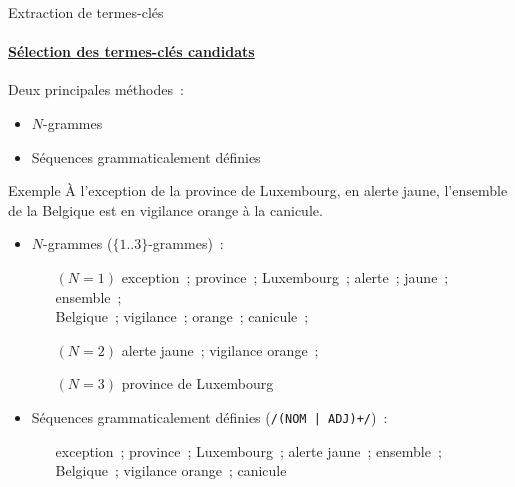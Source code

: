   \begin{frame}[label=selection_des_candidats_back]{Extraction de termes-clés}\framesubtitle{\hyperlink{selection_des_candidats}{Sélection des termes-clés candidats}}
    Deux principales méthodes~:
    \begin{itemize}
      \item{$N$-grammes}
      \item{Séquences grammaticalement définies}
    \end{itemize}

    \begin{exampleblock}{Exemple}\justifying
      \og{}À l'exception de la province de Luxembourg, en alerte jaune,
      l'ensemble de la Belgique est en vigilance orange à la canicule.\fg{}

      \vspace{1em}

      \begin{itemize}
        \item{$N$-grammes ($\{1..3\}$-grammes)~:}
        \begin{itemize}\setlength{\itemindent}{.6cm}
          \item[$(N = 1)$]{
            exception~; province~; Luxembourg~; alerte~; jaune~; ensemble~;\\
            \hspace{.6cm}Belgique~; vigilance~; orange~; canicule~;
          }
          \item[$(N = 2)$]{
            alerte jaune~; vigilance orange~;
          }
          \item[$(N = 3)$]{
            province de Luxembourg
          }
        \end{itemize}
        \item{Séquences grammaticalement définies (\texttt{/(NOM | ADJ)+/})~:}
        \begin{itemize}\setlength{\itemindent}{.6cm}
          \item[]{exception~; province~; Luxembourg~; alerte jaune~;
                ensemble~;\\
                \hspace{.6cm}Belgique~; vigilance orange~; canicule}
        \end{itemize}
      \end{itemize}
    \end{exampleblock}
  \end{frame}

